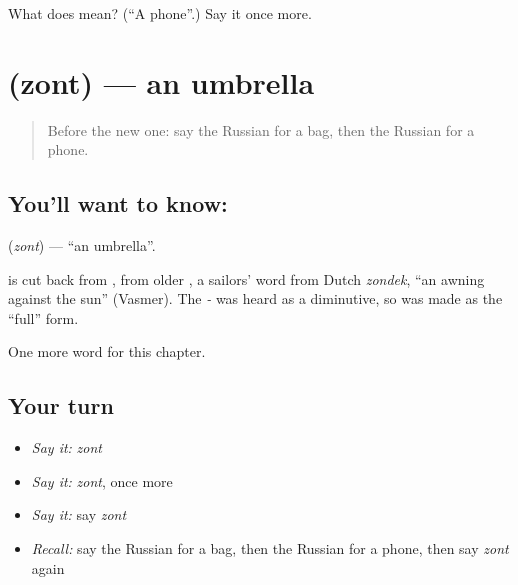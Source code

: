 \begin{tcolorbox}[breakable,colback=teal!4,colframe=teal!35!black,title={Before you move on}]
What does  mean? (\textquotedblleft{}A phone\textquotedblright{}.) Say it once more.
\end{tcolorbox}
\section[\texorpdfstring{\ru{зонт} (zont)}{зонт (zont)}]{ (zont) — an umbrella}

\label{lesson:RU-C53-umbrella}



\begin{quote}
Before the new one: say the Russian for a bag, then the Russian for a phone.
\end{quote}

\subsection*{You'll want to know: }
\textbf{} (\emph{zont}) — \textquotedblleft{}an umbrella\textquotedblright{}.

\begin{cousinweb}
\textbf{} is cut back from \emph{}, from older \emph{}, a sailors' word from Dutch \emph{zondek}, \textquotedblleft{}an awning against the sun\textquotedblright{} (Vasmer). The \emph{-} was heard as a diminutive, so \emph{} was made as the \textquotedblleft{}full\textquotedblright{} form.
\end{cousinweb}

\begin{grammarlens}[title={What you've built}]
One more word for this chapter.
\end{grammarlens}

\subsection*{Your turn}
\begin{itemize}
\raggedright
  \item \emph{Say it:} \emph{zont}
  \item \emph{Say it:} \emph{zont}, once more
  \item \emph{Say it:} say \emph{zont}
  \item \emph{Recall:} say the Russian for a bag, then the Russian for a phone, then say \emph{zont} again
\end{itemize}

